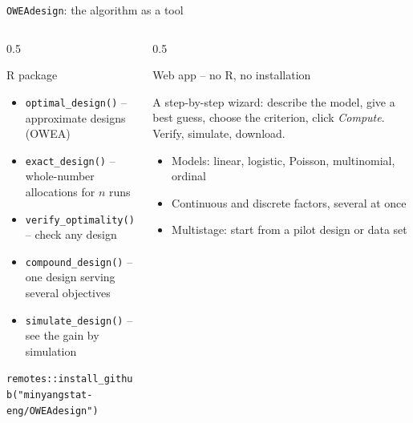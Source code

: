 \documentclass[aspectratio=169,10pt]{beamer}
\begin{document}
\begin{frame}{\texttt{OWEAdesign}: the algorithm as a tool}
  \small
  \begin{columns}[T]
    \begin{column}{0.5\textwidth}
      \begin{block}{R package}
        \begin{itemize}
          \item \texttt{optimal\_design()} -- approximate designs (OWEA)
          \item \texttt{exact\_design()} -- whole-number allocations for $n$ runs
          \item \texttt{verify\_optimality()} -- check any design
          \item \texttt{compound\_design()} -- one design serving several objectives
          \item \texttt{simulate\_design()} -- see the gain by simulation
        \end{itemize}
        {\scriptsize\texttt{remotes::install\_github("minyangstat-eng/OWEAdesign")}}
      \end{block}
    \end{column}
    \begin{column}{0.5\textwidth}
      \begin{alertblock}{Web app -- no R, no installation}
        \\[4pt]
        \raggedright
        A step-by-step wizard: describe the model, give a best guess, choose the criterion, click \emph{Compute}.
        Verify, simulate, download.
      \end{alertblock}
      \begin{itemize}
        \item Models: linear, logistic, Poisson, multinomial, ordinal
        \item Continuous and discrete factors, several at once
        \item Multistage: start from a pilot design or data set
      \end{itemize}
    \end{column}
  \end{columns}
\end{frame}
\end{document}
